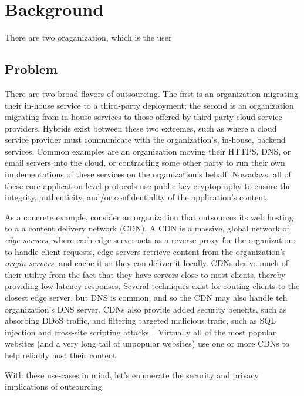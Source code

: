 \section{Background}
\label{sec:background}

There are two oraganization, which is the user




\subsection{Problem}

There are two broad flavors of outsourcing.
%
The first is an organization migrating their in-house service to a third-party
deployment; the second is an organization  migrating from in-house services to
those offered by third party cloud service providers.
%
Hybrids exist between these two extremes, such as where a cloud service
provider must communicate with the organization's, in-house, backend services.
%
Common examples are an organization moving their HTTPS, DNS, or email servers
into the cloud, or contracting some other party to run their own
implementations of these services on the organization's behalf.
%
Nowadays, all of these core application-level protocols use public key
cryptopraphy to ensure the integrity, authenticity, and/or confidentiality of
the application's content.


As a concrete example, consider an organization that outsources its web hosting
to a a content delivery network (CDN)\@.
%
A CDN is a massive, global network of \emph{edge servers}, where each edge
server acts as a reverse proxy for the organization: to
handle client requests, edge servers retrieve content from the organization's
\emph{origin servers}, and cache it so they can deliver it locally.
%
CDNs derive much of their utility from the fact that they have servers close to
most clients, thereby providing low-latency responses.
%
Several techniques exist for routing clients to the closest edge server, but
DNS is common, and so the CDN may also handle teh organization's DNS server.
%
CDNs also provide added security benefits, such as absorbing DDoS
traffic, and filtering targeted malicious trafic, such as SQL injection and
cross-site scripting attacks~\cite{securing-cdns}.
%
Virtually all of the most popular websites (and a very long tail of unpopular
websites) use one or more CDNs to help reliably host their content.


With these use-cases in mind, let's enumerate the security and privacy
implications of outsourcing.


